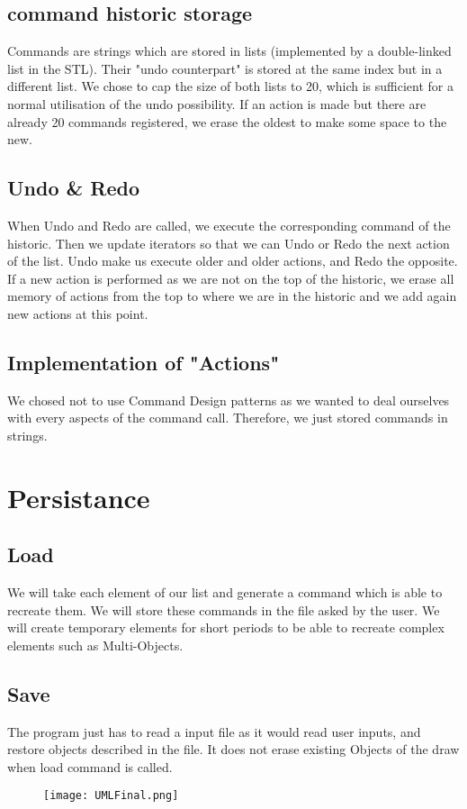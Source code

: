 \documentclass[a4paper, 12pts]{article}
\begin{document}
    \subsection{command historic storage}
        Commands are strings which are stored in lists (implemented by a double-linked list in the STL). Their "undo
        counterpart" is stored at the same index but in a different list. We chose to cap the size of both lists to 20,
        which is sufficient for a normal utilisation of the undo possibility. If an action is made but there are
        already 20 commands registered, we erase the oldest to make some space to the new.

   \subsection{Undo \& Redo}
	When Undo and Redo are called, we execute the corresponding command of the historic. Then we update iterators so that we can Undo or Redo the next action of the list. Undo make us execute older and older actions, and Redo the opposite. If a new action is performed as we are not on the top of the historic, we erase all memory of actions from the top to where we are in the historic and we add again new actions at this point.

   \subsection{Implementation of "Actions"}
	We chosed not to use Command Design patterns as we wanted to deal ourselves with every aspects of the command call. Therefore, we just stored commands in strings.	

\section{Persistance}
    \subsection{Load}
	We will take each element of our list and generate a command which is able to recreate them. We will store these commands in the file asked by the user. We will create temporary elements for short periods to be able to recreate complex elements such as Multi-Objects.
    \subsection{Save}
	The program just has to read a input file as it would read user inputs, and restore objects described in the file. It does not erase existing Objects of the draw when load command is called.
\begin{figure}[b]
	\centerline{\texttt{[image: UMLFinal.png]}}
\end{figure}
\end{document}
